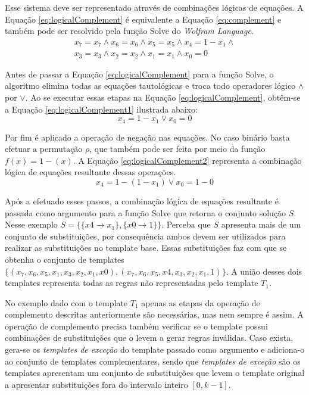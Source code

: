 \documentclass[12pt,a4paper]{article}
\begin{document}
	Esse sistema deve ser representado através de combinações lógicas de equações. A Equação \ref{eq:logicalComplement} é equivalente a Equação \ref{eq:complement} e também pode ser resolvido pela função Solve do \textit{Wolfram Language}.
	\begin{equation}
	\begin{split}
	x_7 = x_7	\wedge  
	x_6 = x_6	\wedge  
	x_5 = x_5	\wedge  
	x_4 = 1 - x_1 \wedge  \\
	x_3 = x_3	\wedge  
	x_2 = x_2	\wedge  
	x_1 = x_1	\wedge  
	x_0 = 0
	\end{split}
	\label{eq:logicalComplement}
	\end{equation}

	Antes de passar a Equação \ref{eq:logicalComplement} para a função Solve, o algoritmo elimina todas as equações tautológicas e troca todo operadores lógico $\wedge$ por $\vee$. Ao se executar essas etapas na Equação \ref{eq:logicalComplement}, obtêm-se a Equação \ref{eq:logicalComplement1} ilustrada abaixo:
	\begin{equation}
	x_4 = 1 - x_1 \vee x_0 = 0
	\label{eq:logicalComplement1}
	\end{equation}

	Por fim é aplicado a operação de negação nas equações. No caso binário basta efetuar a permutação $\rho $, que também pode ser feita por meio da função $f(x) = 1 - (x)$. A Equação \ref{eq:logicalComplement2} representa a combinação lógica de equações resultante dessas operações.
	\begin{equation}
	x_4 = 1 - (1 - x_1) \vee  
	x_0 = 1 - 0
	\label{eq:logicalComplement2}
	\end{equation}

	Após a efetuado esses passos, a combinação lógica de equações resultante é passada como argumento para a função Solve que retorna o conjunto solução $S$. Nesse exemplo $S = \{\{x4 \to x_1\},\{x0\to 1\}\}$. Perceba que $S$ apresenta mais de um conjunto de substituições, por consequência  ambos devem ser utilizados para realizar as substituições no template base. Essas substituições faz com que se obtenha o conjunto de templates $\{(x_7,x_6,x_5,x_1,x_3,x_2,x_1,x0),(x_7,x_6,x_5,x4,x_3,x_2,x_1,1)\}$. A união desses dois templates representa todas as regras não representadas pelo template $T_1$.

	No exemplo dado com o template $T_1$ apenas as etapas da operação de complemento descritas anteriormente são necessárias, mas nem sempre é assim. 
	A operação de complemento precisa também verificar se o template possui combinações de substituições que o levem a gerar regras inválidas. 
	Caso exista, gera-se os \textit{templates de exceção} do template passado como argumento e adiciona-o ao conjunto de templates complementares, sendo que \textit{templates de exceção} são os templates apresentam um conjunto de substituições que levem o template original a apresentar substituições fora do intervalo inteiro $[0, k-1]$.
\end{document}
